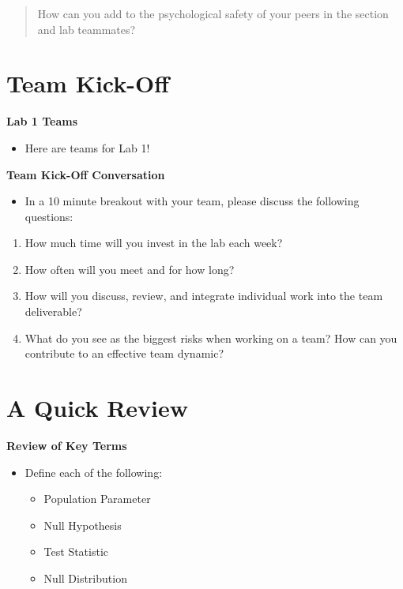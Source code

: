 \documentclass[
]{book}
\providecommand{\tightlist}{%
  \setlength{\itemsep}{0pt}\setlength{\parskip}{0pt}}
\theoremstyle{definition}
\theoremstyle{definition}
\theoremstyle{definition}
\theoremstyle{definition}
\theoremstyle{remark}
\begin{document}
\begin{quote}
How can you add to the psychological safety of your peers in the section and lab teammates?
\end{quote}

\hypertarget{team-kick-off}{%
\section{Team Kick-Off}\label{team-kick-off}}

\textbf{Lab 1 Teams}

\begin{itemize}
\tightlist
\item
  Here are teams for Lab 1!
\end{itemize}

\textbf{Team Kick-Off Conversation}

\begin{itemize}
\tightlist
\item
  In a 10 minute breakout with your team, please discuss the following questions:
\end{itemize}

\begin{enumerate}
\def\labelenumi{\arabic{enumi}.}
\tightlist
\item
  How much time will you invest in the lab each week?
\item
  How often will you meet and for how long?
\item
  How will you discuss, review, and integrate individual work into the team deliverable?
\item
  What do you see as the biggest risks when working on a team? How can you contribute to an effective team dynamic?
\end{enumerate}

\hypertarget{a-quick-review}{%
\section{A Quick Review}\label{a-quick-review}}

\textbf{Review of Key Terms}

\begin{itemize}
\tightlist
\item
  Define each of the following:

  \begin{itemize}
  \tightlist
  \item
    Population Parameter
  \item
    Null Hypothesis
  \item
    Test Statistic
  \item
    Null Distribution
  \end{itemize}
\end{itemize}
\end{document}
